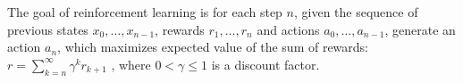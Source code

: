 The goal of reinforcement learning is for each step $n$, given the sequence of previous states $x_0, \ldots, x_{n-1}$, rewards $r_1, \ldots, r_{n}$ and actions $a_0, \ldots, a_{n-1}$, generate an action $a_n$, which maximizes expected value of the sum of rewards:
 $ r = \sum_{k = n}^\infty \gamma^k r_{k+1}$
, where $0 < \gamma \leq 1$ is a discount factor.
%
%
%
